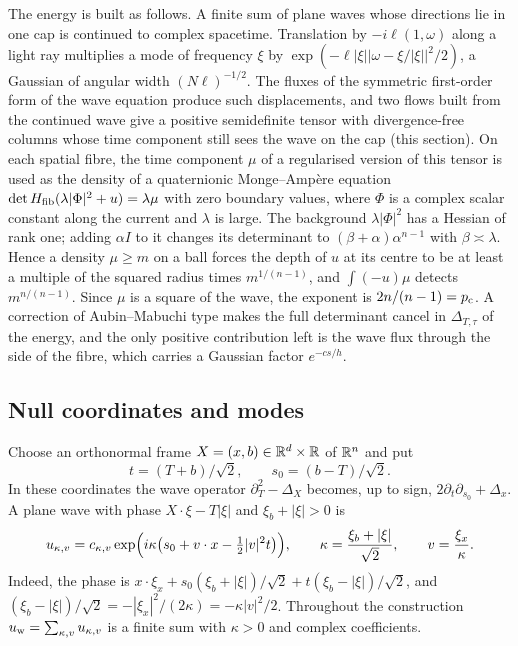 The energy is built as follows. A finite sum of plane waves whose directions lie in one cap
is continued to complex spacetime. Translation by $-i\ell(1,\omega)$ along a light ray
multiplies a mode of frequency $\xi$ by $\exp(-\ell|\xi||\omega-\xi/|\xi||^2/2)$, a Gaussian
of angular width $(N\ell)^{-1/2}$. The fluxes of the symmetric first-order form of the wave
equation produce such displacements, and two flows built from the continued wave give a
positive semidefinite tensor with divergence-free columns whose time component still sees
the wave on the cap (this section). On each spatial fibre, the time component $\mu$ of a
regularised version of this tensor is used as the density of a quaternionic Monge--Amp\`ere
equation $\det H_{\mathrm{fib}}(\lambda|\Phi|^2+u)=\lambda\mu$ with zero boundary values, where $\Phi$
is a complex scalar constant along the current and $\lambda$ is large. The background
$\lambda|\Phi|^2$ has a Hessian of rank one; adding $\alpha I$ to it changes its determinant to
$(\beta+\alpha)\alpha^{n-1}$ with $\beta\asymp\lambda$. Hence a density $\mu\ge m$ on a ball
forces the depth of $u$ at its centre to be at least a multiple of the squared radius times
$m^{1/(n-1)}$, and $\int(-u)\mu$ detects $m^{n/(n-1)}$. Since $\mu$ is a square of the wave,
the exponent is $2n/(n-1)=p_{\mathrm c}$. A correction of Aubin--Mabuchi type makes the full determinant
cancel in $\Delta_{T,\tau}$ of the energy, and the only positive contribution left is the
wave flux through the side of the fibre, which carries a Gaussian factor $e^{-cs/h}$.

\subsection{Null coordinates and modes}\label{ssec:modes}
Choose an orthonormal frame $X=(x,b)\in\mathbb{R}^d\times\mathbb{R}$ of $\mathbb{R}^n$ and put
\[
t=(T+b)/\sqrt2,\qquad s_0=(b-T)/\sqrt2 .
\]
In these coordinates the wave operator $\partial_T^2-\Delta_X$ becomes, up to sign,
$2\partial_t\partial_{s_0}+\Delta_x$. A plane wave with phase $X\cdot\xi-T|\xi|$ and
$\xi_b+|\xi|>0$ is
\begin{equation}\label{eq:mode}
u_{\kappa,v}=c_{\kappa,v}\exp\Bigl(i\kappa\bigl(s_0+v\cdot x-\tfrac12|v|^2t\bigr)\Bigr),\qquad
\kappa=\frac{\xi_b+|\xi|}{\sqrt2},\qquad v=\frac{\xi_x}{\kappa}.
\end{equation}
Indeed, the phase is $x\cdot\xi_x+s_0(\xi_b+|\xi|)/\sqrt2+t(\xi_b-|\xi|)/\sqrt2$, and
$(\xi_b-|\xi|)/\sqrt2=-|\xi_x|^2/(2\kappa)=-\kappa|v|^2/2$. Throughout the construction
$u_{\rm w}=\sum_{\kappa,v}u_{\kappa,v}$ is a finite sum with $\kappa>0$ and complex coefficients.

